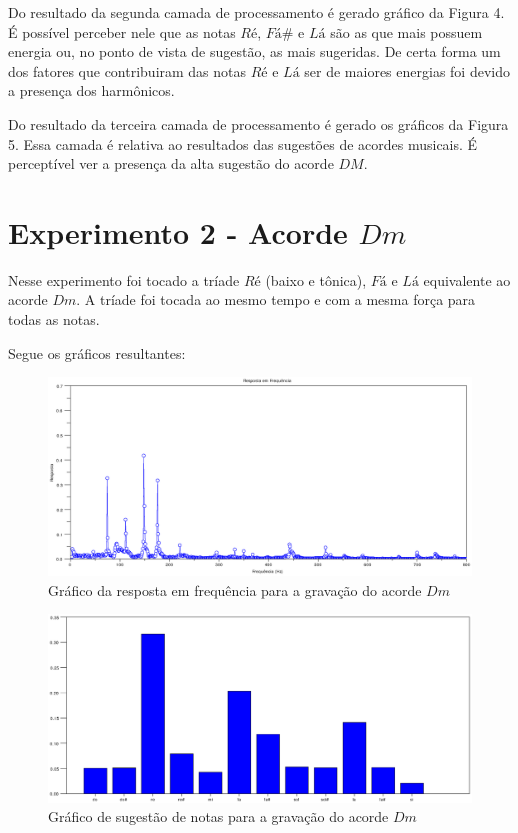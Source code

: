 Do resultado da segunda camada de processamento é gerado gráfico da Figura 4. É possível perceber nele que as notas $Ré$, $Fá\#$ e $Lá$ são as que mais possuem energia ou, no ponto de vista de sugestão, as mais sugeridas. De certa forma um dos fatores que contribuiram das notas $Ré$ e $Lá$ ser de maiores energias foi devido a presença dos harmônicos.

Do resultado da terceira camada de processamento é gerado os gráficos da Figura 5. Essa camada é relativa ao resultados das sugestões de acordes musicais. É perceptível ver a presença da alta sugestão do acorde $DM$.
\newpage
\newpage
\newpage
\section{Experimento 2 - Acorde $Dm$}
\label{sec:experimento2}

Nesse experimento foi tocado a tríade $Ré$ (baixo e tônica), $Fá$ e $Lá$ equivalente ao acorde $Dm$. A tríade foi tocada ao mesmo tempo e com a mesma força para todas as notas.

Segue os gráficos resultantes:

\begin{figure}[h]
	\centering
		\includegraphics[keepaspectratio=true,scale=0.49]{figuras/Dm/fft_Dm.eps}
	\caption{Gráfico da resposta em frequência para a gravação do acorde $Dm$}
\end{figure}

\begin{figure}[h]
	\centering
		\includegraphics[keepaspectratio=true,scale=0.49]{figuras/Dm/notas_Dm.eps}
	\caption{Gráfico de sugestão de notas para a gravação do acorde $Dm$}
\end{figure}


